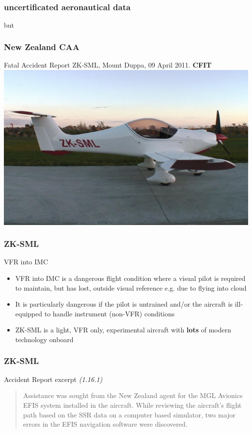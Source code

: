 \begin{frame}
\frametitle{uncertificated aeronautical data}
\large
\begin{center}
but
\end{center}
\end{frame}

\begin{frame}
\frametitle{New Zealand CAA}
\begin{block}{Fatal Accident Report ZK-SML, Mount Duppa, 09 April 2011. \textbf{CFIT}}
\includegraphics[height=0.5\textheight]{image/zk-sml.jpg}
\end{block}
\end{frame}

\begin{frame}
\frametitle{ZK-SML}
\begin{block}{VFR into IMC}
\begin{itemize}
\item<1-> VFR into IMC is a dangerous flight condition where a visual pilot is required to maintain, but has lost, outside visual reference e.g. due to flying into cloud
\item<2-> It is particularly dangerous if the pilot is untrained and/or the aircraft is ill-equipped to handle instrument (non-VFR) conditions
\item<3-> ZK-SML is a light, VFR only, experimental aircraft with \textbf{lots} of modern technology onboard
\end{itemize}
\end{block}
\end{frame}

\begin{frame}
\frametitle{ZK-SML}
\begin{block}{Accident Report excerpt \tiny{\emph{(1.16.1)}}}
\begin{quote}
Assistance was sought from the New Zealand agent for the MGL Avionics EFIS system installed in the aircraft.  While reviewing the aircraft's flight path based on the SSR data on a computer based simulator, two major errors in the EFIS navigation software were discovered. 
\end{quote}
\end{block}
\end{frame}

